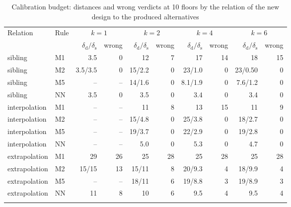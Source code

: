 \documentclass[pdflatex,sn-basic]{sn-jnl}
\newcommand{\tabsize}{\fontsize{8}{9.5}\selectfont}
\begin{document}
\begin{table}[t]
\tabsize
\setlength{\tabcolsep}{3pt}
\caption{Calibration budget: distances and wrong verdicts at 10 floors by the relation of the new design to the produced alternatives}\label{tab:design}
\begin{tabular}{@{}llrrrrrrrr@{}}
\toprule
Relation & Rule & \multicolumn{2}{c}{$k=1$} & \multicolumn{2}{c}{$k=2$} & \multicolumn{2}{c}{$k=4$} & \multicolumn{2}{c}{$k=6$} \\
\cmidrule(lr){3-4}\cmidrule(lr){5-6}\cmidrule(lr){7-8}\cmidrule(lr){9-10}
 & & $\delta_\mathrm{d}/\delta_\mathrm{s}$ & wrong & $\delta_\mathrm{d}/\delta_\mathrm{s}$ & wrong & $\delta_\mathrm{d}/\delta_\mathrm{s}$ & wrong & $\delta_\mathrm{d}/\delta_\mathrm{s}$ & wrong \\
\midrule
sibling & M1 & 3.5 & 0 & 12 & 7 & 17 & 14 & 18 & 15 \\
sibling & M2 & 3.5/3.5 & 0 & 15/2.2 & 0 & 23/1.0 & 0 & 23/0.50 & 0 \\
sibling & M5 & -- & -- & 14/1.6 & 0 & 8.1/1.9 & 0 & 7.6/1.2 & 0 \\
sibling & NN & 3.5 & 0 & 3.5 & 0 & 3.4 & 0 & 3.4 & 0 \\
interpolation & M1 & -- & -- & 11 & 8 & 13 & 15 & 11 & 9 \\
interpolation & M2 & -- & -- & 15/4.8 & 0 & 25/3.8 & 0 & 18/2.7 & 0 \\
interpolation & M5 & -- & -- & 19/3.7 & 0 & 22/2.9 & 0 & 19/2.8 & 0 \\
interpolation & NN & -- & -- & 5.0 & 0 & 5.3 & 0 & 4.7 & 0 \\
extrapolation & M1 & 29 & 26 & 25 & 28 & 25 & 28 & 25 & 28 \\
extrapolation & M2 & 15/15 & 13 & 15/11 & 8 & 20/9.3 & 4 & 18/9.9 & 4 \\
extrapolation & M5 & -- & -- & 18/11 & 6 & 19/8.8 & 3 & 19/8.9 & 3 \\
extrapolation & NN & 11 & 8 & 10 & 6 & 9.5 & 4 & 9.5 & 4 \\
\botrule
\end{tabular}
\end{table}
\end{document}
